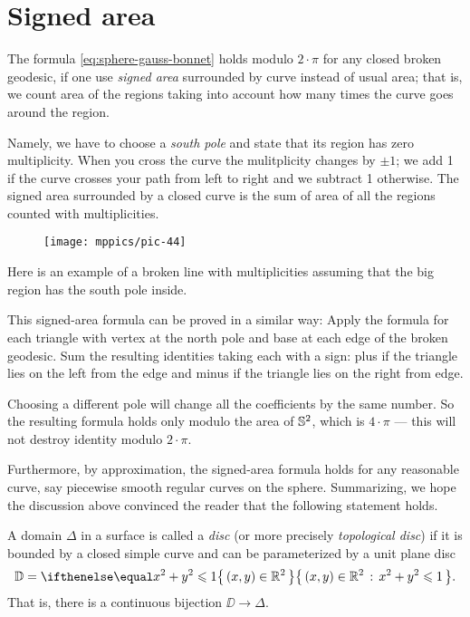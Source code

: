 





\section*{Signed area}
The formula \ref{eq:sphere-gauss-bonnet} holds modulo $2\cdot \pi$ for any closed broken geodesic, if one use \emph{signed area} surrounded by curve instead of usual area;
that is, we count area of the regions taking into account how many times the curve goes around the region.

Namely, we have to choose a \emph{south pole} and state that its region has zero multiplicity.
When you cross the curve the mulitplicity changes by $\pm1$; we add 1 if the curve crosses your path from left to right and we subtract 1 otherwise.
The signed area surrounded by a closed curve is the sum of area of all the regions counted with multiplicities.

\begin{wrapfigure}{o}{32 mm}
\vskip-0mm
\centering
\texttt{[image: mppics/pic-44]}
\vskip-0mm
\end{wrapfigure}

Here is an example of a broken line with multiplicities assuming that the big region has the south pole inside.

This signed-area formula can be proved in a similar way:
Apply the formula for each triangle with vertex at the north pole and base at each edge of the broken geodesic.
Sum the resulting identities taking each with a sign: plus if the triangle lies on the left from the edge and minus if the triangle lies on the right from edge.

Choosing a different pole will change all the coefficients by the same number.
So the resulting formula holds only modulo the area of $\mathbb{S}^2$, which is $4\cdot \pi$ --- this will not destroy identity modulo $2\cdot\pi$.

Furthermore, by approximation, the signed-area formula holds for any reasonable curve, say piecewise smooth regular curves on the sphere.
Summarizing, we hope the discussion above convinced the reader that the following statement holds.

A domain $\Delta$ in a surface is called a \emph{disc} (or more precisely \emph{topological disc}) if it is bounded by a closed simple curve and can be parameterized by a unit plane disc 
\[\DD=\set{(x,y)\in\RR^2}{x^2+y^2\le1}.\]
That is, there is a continuous bijection $\DD\to\Delta$.

